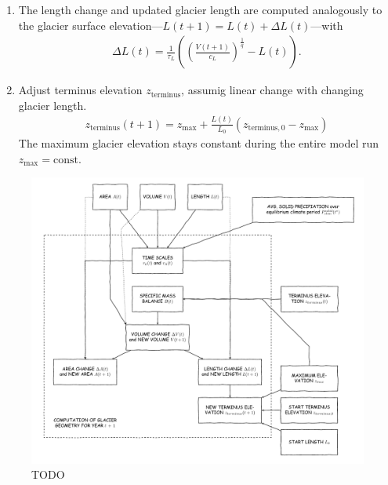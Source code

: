 \begin{enumerate}
            \item The length change and updated glacier length are computed analogously to the glacier surface elevation---$L(t+1) = L(t) + \Delta L(t)$---with
            \begin{align}
                \Delta L(t) = \frac{1}{\tau_L}\left(\left(\frac{V(t+1)}{c_L}\right)^\frac{1}{q} - L(t)\right).
            \end{align}
            \item Adjust terminus elevation $z_\text{terminus}$, assumig linear change with changing glacier length.
            \begin{align}
                z_\text{terminus}(t+1) = z_\text{max} + \frac{L(t)}{L_0}(z_{\text{terminus},0} - z_\text{max})
            \end{align}
            The maximum glacier elevation stays constant during the entire model run $z_\text{max} = \text{const.}$
            
        \end{enumerate}
        
        \begin{figure}[tbh]
            \centering
            \includegraphics[width=\textwidth]{../flowchart/iterations/scaling.pdf}
            \caption{TODO}
            \label{fig:iteration-scheme}
        \end{figure}
        
    
